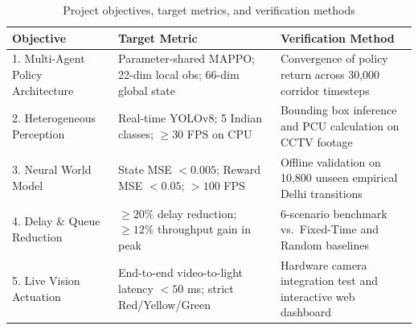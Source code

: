 \documentclass[12pt,a4paper,oneside]{report}
\begin{document}
\begin{table}[htbp]
\centering
\small
\caption{Project objectives, target metrics, and verification methods}
\label{tab:objectives_mapping}
\begin{tabularx}{\textwidth}{|p{3.8cm}|p{4.8cm}|X|}
\hline
\textbf{Objective} & \textbf{Target Metric} & \textbf{Verification Method} \\ \hline
1. Multi-Agent Policy Architecture & Parameter-shared MAPPO; 22-dim local obs; 66-dim global state & Convergence of policy return across 30,000 corridor timesteps \\ \hline
2. Heterogeneous Perception & Real-time YOLOv8; 5 Indian classes; $\ge 30$ FPS on CPU & Bounding box inference and PCU calculation on CCTV footage \\ \hline
3. Neural World Model & State MSE $< 0.005$; Reward MSE $< 0.05$; $> 100$ FPS & Offline validation on 10,800 unseen empirical Delhi transitions \\ \hline
4. Delay \& Queue Reduction & $\ge 20\%$ delay reduction; $\ge 12\%$ throughput gain in peak & 6-scenario benchmark vs.\ Fixed-Time and Random baselines \\ \hline
5. Live Vision Actuation & End-to-end video-to-light latency $< 50$ ms; strict Red/Yellow/Green & Hardware camera integration test and interactive web dashboard \\ \hline
\end{tabularx}
\end{table}
\end{document}
